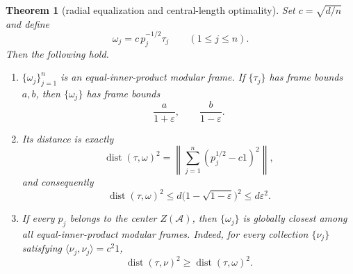 \documentclass[11pt]{article}
\newtheorem{theorem}{Theorem}
\newcommand{\A}{\mathcal A}
\newcommand{\dist}{\operatorname{dist}}
\begin{document}
\begin{theorem}[radial equalization and central-length optimality]
\label{thm:main}
Set $c=\sqrt{d/n}$ and define
\begin{equation}\label{eq:radial}
 \omega_j=c\,p_j^{-1/2}\tau_j\qquad(1\le j\le n).
\end{equation}
Then the following hold.
\begin{enumerate}
\item $\{\omega_j\}_{j=1}^n$ is an equal-inner-product modular frame.
If $\{\tau_j\}$ has frame bounds $a,b$, then $\{\omega_j\}$ has frame
bounds
\[
 \frac{a}{1+\varepsilon},\qquad \frac{b}{1-\varepsilon}.
\]
\item Its distance is exactly
\begin{equation}\label{eq:exact}
 \dist(\tau,\omega)^2
 =\left\|\sum_{j=1}^n(p_j^{1/2}-c1)^2\right\|,
\end{equation}
and consequently
\begin{equation}\label{eq:bound}
 \dist(\tau,\omega)^2
 \le d\bigl(1-\sqrt{1-\varepsilon}\bigr)^2
 \le d\varepsilon^2.
\end{equation}
\item If every $p_j$ belongs to the center $Z(\A)$, then
$\{\omega_j\}$ is globally closest among all equal-inner-product modular
frames.  Indeed, for every collection $\{\nu_j\}$ satisfying
$\langle\nu_j,\nu_j\rangle=c^2 1$,
\begin{equation}\label{eq:global}
 \dist(\tau,\nu)^2\ge \dist(\tau,\omega)^2.
\end{equation}
\end{enumerate}
\end{theorem}
\end{document}
